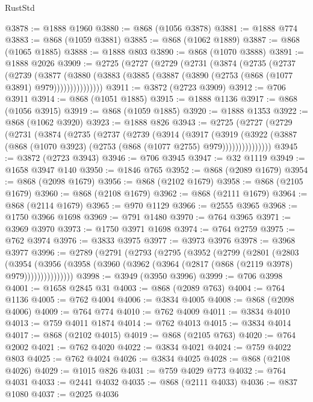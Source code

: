 \begin{lexlean}{RustStd}
\begin{coremodule}
@3878 := @1888 @1960
@3880 := @868 (@1056 @3878)
@3881 := @1888 @774
@3883 := @868 (@1059 @3881)
@3885 := @868 (@1062 @1889)
@3887 := @868 (@1065 @1885)
@3888 := @1888 @803
@3890 := @868 (@1070 @3888)
@3891 := @1888 @2026
@3909 := @2725
    (@2727
      (@2729
        (@2731
          (@3874
            (@2735
              (@2737
                (@2739
                  (@3877
                    (@3880
                      (@3883 (@3885 (@3887 (@3890 (@2753 (@868 (@1077 @3891) @979)))))))))))))))
@3911 := @3872 (@2723 @3909)
@3912 := @706 @3911
@3914 := @868 (@1051 @1885)
@3915 := @1888 @1136
@3917 := @868 (@1056 @3915)
@3919 := @868 (@1059 @1885)
@3920 := @1888 @1353
@3922 := @868 (@1062 @3920)
@3923 := @1888 @826
@3943 := @2725
    (@2727
      (@2729
        (@2731
          (@3874
            (@2735
              (@2737
                (@2739
                  (@3914
                    (@3917
                      (@3919
                        (@3922
                          (@3887 (@868 (@1070 @3923) (@2753 (@868 (@1077 @2755) @979)))))))))))))))
@3945 := @3872 (@2723 @3943)
@3946 := @706 @3945
@3947 := @32 @1119
@3949 := @1658 @3947 @140
@3950 := @1846 @765
@3952 := @868 (@2089 @1679)
@3954 := @868 (@2098 @1679)
@3956 := @868 (@2102 @1679)
@3958 := @868 (@2105 @1679)
@3960 := @868 (@2108 @1679)
@3962 := @868 (@2111 @1679)
@3964 := @868 (@2114 @1679)
@3965 := @970 @1129
@3966 := @2555 @3965
@3968 := @1750 @3966 @1698
@3969 := @791 @1480
@3970 := @764 @3965
@3971 := @3969 @3970
@3973 := @1750 @3971 @1698
@3974 := @764 @2759
@3975 := @762 @3974
@3976 := @3833 @3975
@3977 := @3973 @3976
@3978 := @3968 @3977
@3996 := @2789
    (@2791
      (@2793
        (@2795
          (@3952
            (@2799
              (@2801
                (@2803
                  (@3954
                    (@3956
                      (@3958 (@3960 (@3962 (@3964 (@2817 (@868 (@2119 @3978) @979)))))))))))))))
@3998 := @3949 (@3950 @3996)
@3999 := @706 @3998
@4001 := @1658 @2845 @31
@4003 := @868 (@2089 @763)
@4004 := @764 @1136
@4005 := @762 @4004
@4006 := @3834 @4005
@4008 := @868 (@2098 @4006)
@4009 := @764 @774
@4010 := @762 @4009
@4011 := @3834 @4010
@4013 := @759 @4011 @1874
@4014 := @762 @4013
@4015 := @3834 @4014
@4017 := @868 (@2102 @4015)
@4019 := @868 (@2105 @763)
@4020 := @764 @2002
@4021 := @762 @4020
@4022 := @3834 @4021
@4024 := @759 @4022 @803
@4025 := @762 @4024
@4026 := @3834 @4025
@4028 := @868 (@2108 @4026)
@4029 := @1015 @826
@4031 := @759 @4029 @773
@4032 := @764 @4031
@4033 := @2441 @4032
@4035 := @868 (@2111 @4033)
@4036 := @837 @1080
@4037 := @2025 @4036

\end{coremodule}
\end{lexlean}
